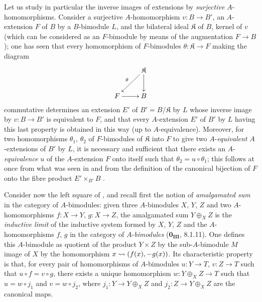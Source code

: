 \begin{env}[18.2.6]
\label{0.18.2.6}
Let us study in particular the inverse images of extensions by \emph{surjective} $A$-homomorphisms.
Consider a surjective $A$-homomorphism $v:B\to B'$, an $A$-extension $F$ of $B$ by a $B$-bimodule $L$, and the bilateral ideal $\mathfrak{K}$ of $B$, kernel of $v$ (which can be considered as an $F$-bimodule by means of the augmentation $F\to B$); one has seen  that every homomorphism of $F$-bimodules $\theta:\mathfrak{K}\to F$ making the diagram
\[
  \xymatrix{
    & \mathfrak{K}\ar[ld]_\theta\ar[d]\\
    F\ar[r] & B
  }
\]
commutative determines an extension $E'$ of $B'=B/\mathfrak{K}$ by $L$ whose inverse image by $v:B\to B'$ is equivalent to $F$, and that every $A$-extension $E'$ of $B'$ by $L$ having this last property is obtained in this way (up to $A$-equivalence).
Moreover, for two homomorphisms $\theta_1$, $\theta_2$ of $F$-bimodules of $\mathfrak{K}$ into $F$ to give two $A$-\emph{equivalent} $A$-extensions of $B'$ by $L$, it is necessary and sufficient that there exists an $A$-\emph{equivalence} $u$ of the $A$-extension $F$ onto itself such that
$\theta_2=u\circ\theta_1$; this follows at once from what was seen in  and from the definition of the canonical bijection of $F$ onto the fibre product $E'\times_{B'}B$ .
\end{env}

\begin{env}[18.2.7]
\label{0.18.2.7}
Consider now the left square of , and recall first the notion of \emph{amalgamated sum} in the category of $A$-bimodules: given three $A$-bimodules $X$, $Y$, $Z$ and two $A$-homomorphisms $f:X\to Y$, $g:X\to Z$, the amalgamated sum $Y\oplus_X Z$ is the \emph{inductive limit} of the inductive system formed by $X$, $Y$, $Z$ and the $A$-homomorphisms $f$, $g$ in the category of $A$-\emph{bimodules} ($\mathbf{0_{III}}$, 8.1.11).
One defines this $A$-bimodule as quotient of the product $Y\times Z$ by the sub-$A$-bimodule $M$ image of $X$ by the homomorphism $x\leadsto(f(x),- g(x))$.
Its characteristic property is that, for every pair of homomorphisms of $A$-bimodules $u:Y\to T$, $v:Z\to T$ such that $u\circ f=v\circ g$, there exists a unique homomorphism $w:Y\oplus_X Z\to T$ such that $u=w\circ j_1$ and $v=w\circ j_2$, where $j_1:Y\to Y\oplus_X Z$ and $j_2:Z\to Y\oplus_X Z$ are the canonical maps.
\end{env}

